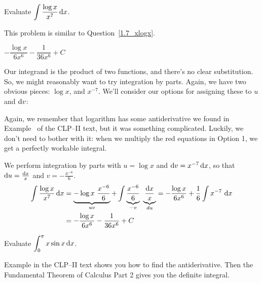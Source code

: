 \begin{question}[M105 2013A]\label{1.7_xlogx2}
Evaluate ${\displaystyle\int \frac{\log x}{x^7}\,\mathrm{d}x}$.
\end{question}

\begin{hint}
This problem is similar to Question~\ref{1.7_xlogx}.
\end{hint}

\begin{answer}
$- \dfrac{\log x}{6 x^6} - \dfrac{1}{36 x^6} + C$
\end{answer}

\begin{solution}
Our integrand is the product of two functions, and there's no clear substitution. So, we might reasonably want to try integration by parts. Again, we have two obvious pieces: $\log x$, and $x^{-7}$. We'll consider our options for assigning these to $u$ and $\mathrm{d}v$:


Again, we remember that logarithm has some antiderivative we found in Example~ of the CLP--II text, but it was something complicated. Luckily, we don't need to bother with it: when we multiply the red equations in Option 1, we get a perfectly workable integral.

We perform integration by parts with $u=\log x$ and $\mathrm{d}v=x^{-7}\,\mathrm{d}x$,
so that $\mathrm{d}u=\frac{\mathrm{d}x}{x}$ and $v = -\frac{x^{-6}}{6}$.
\begin{align*}
\int \frac{\log x}{x^7}\,\mathrm{d}x
   &=\underbrace{ -\log x\ \frac{x^{-6}}{6}}_{uv} + \int \underbrace{\frac{x^{-6}}{6}}_{-v}\ \underbrace{\frac{\mathrm{d}x}{x}}_{du}
    = - \frac{\log x}{6 x^6} +\frac{1}{6} \int x^{-7} \ \mathrm{d}x \\
   &= - \frac{\log x}{6 x^6} - \frac{1}{36 x^6} + C
\end{align*}
\end{solution}

\begin{Mquestion}[2016A]\label{1.7_xsinx}
Evaluate $\displaystyle\int_0^\pi x\sin x\,\mathrm{d}x$.
\end{Mquestion}

\begin{hint}
 Example  in the
CLP--II text shows you how to find the antiderivative. Then the Fundamental Theorem of Calculus Part 2 gives you the definite integral.
\end{hint}

